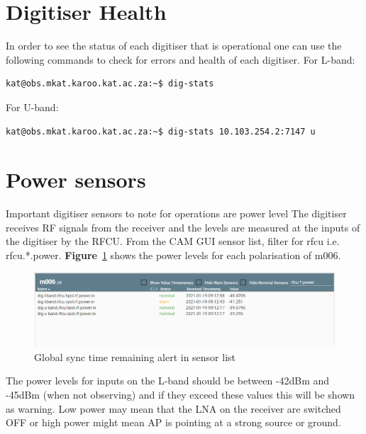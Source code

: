 \section{ Digitiser Health}
In order to see the status of each digitiser that is operational one can use the following
commands to check for errors and health of each digitiser.
For L-band:
\begin{lstlisting}[style=DOS]
kat@obs.mkat.karoo.kat.ac.za:~$ dig-stats
\end{lstlisting}
For U-band:
\begin{lstlisting}[style=DOS]
kat@obs.mkat.karoo.kat.ac.za:~$ dig-stats 10.103.254.2:7147 u
\end{lstlisting}

\section{ Power sensors}
Important digitiser sensors to note for operations are power level The digitiser receives RF
signals from the receiver and the levels are measured at the inputs of the digitiser by the
RFCU. From the CAM GUI sensor list, filter for rfcu i.e. rfcu.*.power.  \textbf{Figure}~\ref{fig:image83} shows the power levels for each polarisation of m006.
\begin{figure}[H]
	\centering
	\includegraphics[scale=0.39]{Chapters/images/image83.png}
	
	\caption{Global sync time remaining alert in sensor list}
	\label{fig:image83}
\end{figure}
The power levels for inputs on the L-band should be between -42dBm and -45dBm (when
not observing) and if they exceed these values this will be shown as warning. Low power
may mean that the LNA on the receiver are switched OFF or high power might mean AP is
pointing at a strong source or ground.\\

